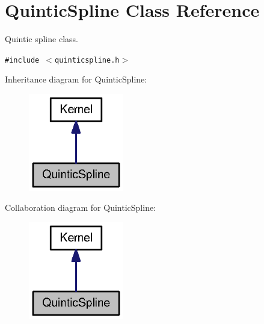 \hypertarget{classQuinticSpline}{
\section{QuinticSpline Class Reference}
\label{classQuinticSpline}
}
Quintic spline class.  


{\tt \#include $<$quinticspline.h$>$}

Inheritance diagram for QuinticSpline:\nopagebreak
\begin{figure}[H]
\begin{center}
\leavevmode
\includegraphics[width=118pt]{classQuinticSpline__inherit__graph}
\end{center}
\end{figure}
Collaboration diagram for QuinticSpline:\nopagebreak
\begin{figure}[H]
\begin{center}
\leavevmode
\includegraphics[width=118pt]{classQuinticSpline__coll__graph}
\end{center}
\end{figure}
